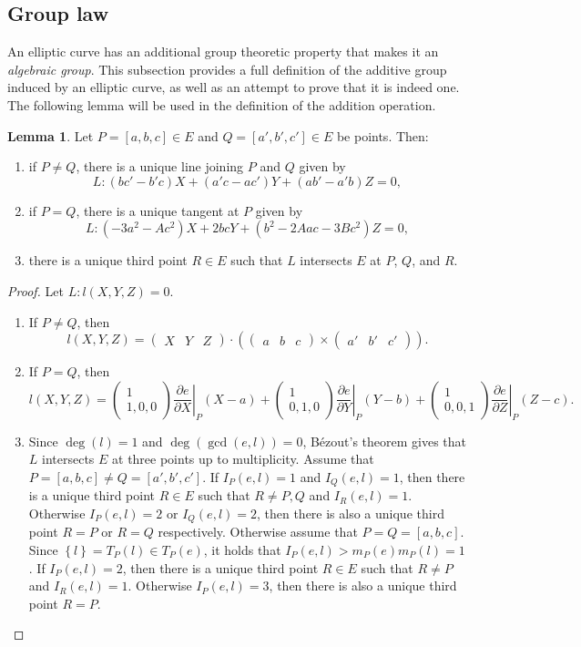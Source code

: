 \documentclass{article}
\newcommand{\val}[1]{\left. #1 \right\rvert}
\newcommand{\rb}[1]{\left( #1 \right)}
\renewcommand{\sb}[1]{\left[ #1 \right]}
\newcommand{\cb}[1]{\left\{ #1 \right\}}
\newcommand{\two}[2]{\begin{pmatrix} #1 \\ #2 \end{pmatrix}}
\newcommand{\three}[3]{\begin{pmatrix} #1 & #2 & #3 \end{pmatrix}}
\theoremstyle{definition}\newtheorem*{definition}{Definition}
\theoremstyle{definition}\newtheorem*{example}{Example}
\theoremstyle{definition}\newtheorem*{remark}{Remark}
\newtheorem{lemma}[proposition]{Lemma}
\begin{document}
\pagebreak

\subsection{Group law}

An elliptic curve has an additional group theoretic property that makes it an \emph{algebraic group}. This subsection provides a full definition of the additive group induced by an elliptic curve, as well as an attempt to prove that it is indeed one. The following lemma will be used in the definition of the addition operation.

\begin{lemma}
\label{lem:thirdpoint}
Let $ P = \sb{a, b, c} \in E $ and $ Q = \sb{a', b', c'} \in E $ be points. Then:
\begin{enumerate}
\item if $ P \ne Q $, there is a unique line joining $ P $ and $ Q $ given by
$$ L : \rb{bc' - b'c}X + \rb{a'c - ac'}Y + \rb{ab' - a'b}Z = 0, $$
\item if $ P = Q $, there is a unique tangent at $ P $ given by
$$ L : \rb{-3a^2 - Ac^2}X + 2bcY + \rb{b^2 - 2Aac - 3Bc^2}Z = 0, $$
\item there is a unique third point $ R \in E $ such that $ L $ intersects $ E $ at $ P $, $ Q $, and $ R $.
\end{enumerate}
\end{lemma}

\begin{proof}
Let $ L : l\rb{X, Y, Z} = 0 $.
\begin{enumerate}
\item If $ P \ne Q $, then
$$ l\rb{X, Y, Z} = \three{X}{Y}{Z} \cdot \rb{\three{a}{b}{c} \times \three{a'}{b'}{c'}}. $$
\item If $ P = Q $, then
$$ l\rb{X, Y, Z} = \two{1}{1, 0, 0}\val{\dfrac{\partial e}{\partial X}}_P\rb{X - a} + \two{1}{0, 1, 0}\val{\dfrac{\partial e}{\partial Y}}_P\rb{Y - b} + \two{1}{0, 0, 1}\val{\dfrac{\partial e}{\partial Z}}_P\rb{Z - c}. $$
\item Since $ \deg\rb{l} = 1 $ and $ \deg\rb{\gcd\rb{e, l}} = 0 $, Bézout's theorem gives that $ L $ intersects $ E $ at three points up to multiplicity. Assume that $ P = \sb{a, b, c} \ne Q = \sb{a', b', c'} $. If $ I_P\rb{e, l} = 1 $ and $ I_Q\rb{e, l} = 1 $, then there is a unique third point $ R \in E $ such that $ R \ne P, Q $ and $ I_R\rb{e, l} = 1 $. Otherwise $ I_P\rb{e, l} = 2 $ or $ I_Q\rb{e, l} = 2 $, then there is also a unique third point $ R = P $ or $ R = Q $ respectively. Otherwise assume that $ P = Q = \sb{a, b, c} $. Since $ \cb{l} = T_P\rb{l} \in T_P\rb{e} $, it holds that $ I_P\rb{e, l} > m_P\rb{e}m_P\rb{l} = 1 $. If $ I_P\rb{e, l} = 2 $, then there is a unique third point $ R \in E $ such that $ R \ne P $ and $ I_R\rb{e, l} = 1 $. Otherwise $ I_P\rb{e, l} = 3 $, then there is also a unique third point $ R = P $.
\end{enumerate}
\end{proof}
\end{document}
